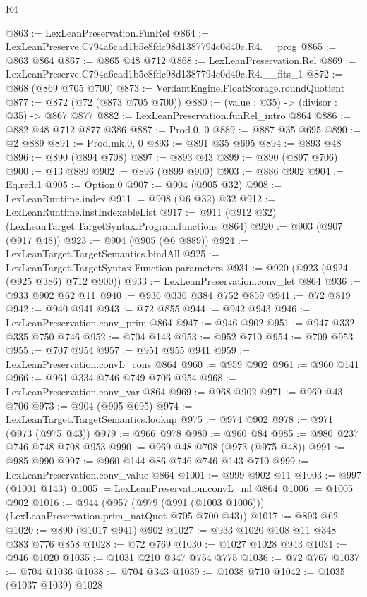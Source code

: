 \begin{lexlean}{R4}
\begin{coremodule}
@863 := LexLeanPreservation.FunRel
@864 := LexLeanPreserve.C794a6cad1b5e8fdc98d1387794c0d40c.R4.__prog
@865 := @863 @864
@867 := @865 @48 @712
@868 := LexLeanPreservation.Rel
@869 := LexLeanPreserve.C794a6cad1b5e8fdc98d1387794c0d40c.R4.__fits_1
@872 := @868 (@869 @705 @700)
@873 := VerdantEngine.FloatStorage.roundQuotient
@877 := @872 (@72 (@873 @705 @700))
@880 := (value : @35) -> (divisor : @35) -> @867 @877
@882 := LexLeanPreservation.funRel_intro @864
@886 := @882 @48 @712 @877 @386
@887 := Prod.{0, 0}
@889 := @887 @35 @695
@890 := @2 @889
@891 := Prod.mk.{0, 0}
@893 := @891 @35 @695
@894 := @893 @48
@896 := @890 (@894 @708)
@897 := @893 @43
@899 := @890 (@897 @706)
@900 := @13 @889
@902 := @896 (@899 @900)
@903 := @886 @902
@904 := Eq.refl.{1}
@905 := Option.{0}
@907 := @904 (@905 @32)
@908 := LexLeanRuntime.index
@911 := @908 (@6 @32) @32
@912 := LexLeanRuntime.instIndexableList
@917 := @911 (@912 @32) (LexLeanTarget.TargetSyntax.Program.functions @864)
@920 := @903 (@907 (@917 @48))
@923 := @904 (@905 (@6 @889))
@924 := LexLeanTarget.TargetSemantics.bindAll
@925 := LexLeanTarget.TargetSyntax.Function.parameters
@931 := @920 (@923 (@924 (@925 @386) @712 @900))
@933 := LexLeanPreservation.conv_let @864
@936 := @933 @902 @62 @11
@940 := @936 @336 @384 @752 @859
@941 := @72 @819
@942 := @940 @941
@943 := @72 @855
@944 := @942 @943
@946 := LexLeanPreservation.conv_prim @864
@947 := @946 @902
@951 := @947 @332 @335 @750 @746
@952 := @704 @143
@953 := @952 @710
@954 := @709 @953
@955 := @707 @954
@957 := @951 @955 @941
@959 := LexLeanPreservation.convL_cons @864
@960 := @959 @902
@961 := @960 @141
@966 := @961 @334 @746 @749 @706 @954
@968 := LexLeanPreservation.conv_var @864
@969 := @968 @902
@971 := @969 @43 @706
@973 := @904 (@905 @695)
@974 := LexLeanTarget.TargetSemantics.lookup
@975 := @974 @902
@978 := @971 (@973 (@975 @43))
@979 := @966 @978
@980 := @960 @84
@985 := @980 @237 @746 @748 @708 @953
@990 := @969 @48 @708 (@973 (@975 @48))
@991 := @985 @990
@997 := @960 @144 @86 @746 @746 @143 @710
@999 := LexLeanPreservation.conv_value @864
@1001 := @999 @902 @11
@1003 := @997 (@1001 @143)
@1005 := LexLeanPreservation.convL_nil @864
@1006 := @1005 @902
@1016 := @944 (@957 (@979 (@991 (@1003 @1006))) (LexLeanPreservation.prim_natQuot @705 @700 @43))
@1017 := @893 @62
@1020 := @890 (@1017 @941) @902
@1027 := @933 @1020 @108 @11 @348 @383 @776 @858
@1028 := @72 @769
@1030 := @1027 @1028 @943
@1031 := @946 @1020
@1035 := @1031 @210 @347 @754 @775
@1036 := @72 @767
@1037 := @704 @1036
@1038 := @704 @343
@1039 := @1038 @710
@1042 := @1035 (@1037 @1039) @1028

\end{coremodule}
\end{lexlean}
